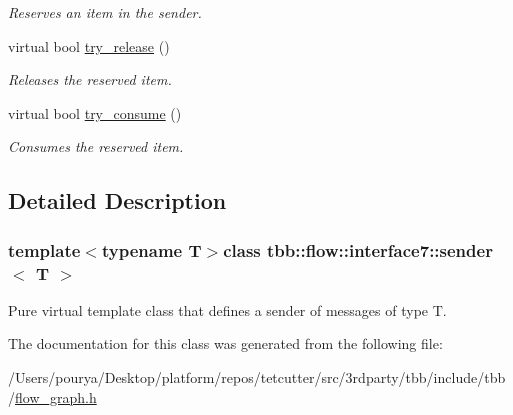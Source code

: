\begin{DoxyCompactItemize}
\begin{DoxyCompactList}\small\item\em Reserves an item in the sender. \end{DoxyCompactList}\item 
\hypertarget{classtbb_1_1flow_1_1interface7_1_1sender_a97ac316ddfb6bd7c7f2f56e3e819a30a}{}virtual bool \hyperlink{classtbb_1_1flow_1_1interface7_1_1sender_a97ac316ddfb6bd7c7f2f56e3e819a30a}{try\+\_\+release} ()\label{classtbb_1_1flow_1_1interface7_1_1sender_a97ac316ddfb6bd7c7f2f56e3e819a30a}

\begin{DoxyCompactList}\small\item\em Releases the reserved item. \end{DoxyCompactList}\item 
\hypertarget{classtbb_1_1flow_1_1interface7_1_1sender_ad404d5218c7ae2556261ffa880cdf804}{}virtual bool \hyperlink{classtbb_1_1flow_1_1interface7_1_1sender_ad404d5218c7ae2556261ffa880cdf804}{try\+\_\+consume} ()\label{classtbb_1_1flow_1_1interface7_1_1sender_ad404d5218c7ae2556261ffa880cdf804}

\begin{DoxyCompactList}\small\item\em Consumes the reserved item. \end{DoxyCompactList}\end{DoxyCompactItemize}


\subsection{Detailed Description}
\subsubsection*{template$<$typename T$>$class tbb\+::flow\+::interface7\+::sender$<$ T $>$}

Pure virtual template class that defines a sender of messages of type T. 

The documentation for this class was generated from the following file\+:\begin{DoxyCompactItemize}
\item 
/\+Users/pourya/\+Desktop/platform/repos/tetcutter/src/3rdparty/tbb/include/tbb/\hyperlink{flow__graph_8h}{flow\+\_\+graph.\+h}\end{DoxyCompactItemize}
